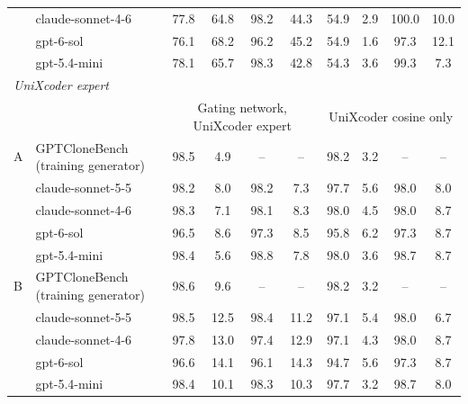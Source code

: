 \begin{table}[t]
\begin{tabular}{ll|cc|cc|cc|cc}
 & claude-sonnet-4-6 & 77.8 & 64.8 & 98.2 & 44.3 & 54.9 & 2.9 & 100.0 & 10.0 \\
 & gpt-6-sol & 76.1 & 68.2 & 96.2 & 45.2 & 54.9 & 1.6 & 97.3 & 12.1 \\
 & gpt-5.4-mini & 78.1 & 65.7 & 98.3 & 42.8 & 54.3 & 3.6 & 99.3 & 7.3 \\
\midrule
\multicolumn{10}{l}{\emph{UniXcoder expert}} \\
 & & \multicolumn{4}{c|}{Gating network, UniXcoder expert} & \multicolumn{4}{c}{UniXcoder cosine only} \\
A & GPTCloneBench (training generator) & 98.5 & 4.9 & -- & -- & 98.2 & 3.2 & -- & -- \\
 & claude-sonnet-5-5 & 98.2 & 8.0 & 98.2 & 7.3 & 97.7 & 5.6 & 98.0 & 8.0 \\
 & claude-sonnet-4-6 & 98.3 & 7.1 & 98.1 & 8.3 & 98.0 & 4.5 & 98.0 & 8.7 \\
 & gpt-6-sol & 96.5 & 8.6 & 97.3 & 8.5 & 95.8 & 6.2 & 97.3 & 8.7 \\
 & gpt-5.4-mini & 98.4 & 5.6 & 98.8 & 7.8 & 98.0 & 3.6 & 98.7 & 8.7 \\
\midrule
B & GPTCloneBench (training generator) & 98.6 & 9.6 & -- & -- & 98.2 & 3.2 & -- & -- \\
 & claude-sonnet-5-5 & 98.5 & 12.5 & 98.4 & 11.2 & 97.1 & 5.4 & 98.0 & 6.7 \\
 & claude-sonnet-4-6 & 97.8 & 13.0 & 97.4 & 12.9 & 97.1 & 4.3 & 98.0 & 8.7 \\
 & gpt-6-sol & 96.6 & 14.1 & 96.1 & 14.3 & 94.7 & 5.6 & 97.3 & 8.7 \\
 & gpt-5.4-mini & 98.4 & 10.1 & 98.3 & 10.3 & 97.7 & 3.2 & 98.7 & 8.0 \\
\bottomrule
\end{tabular}
\end{table}